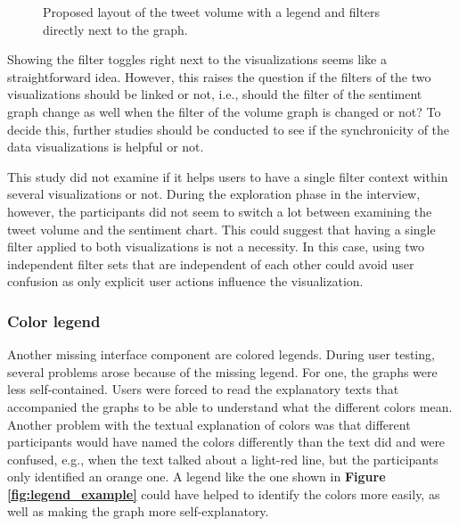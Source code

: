 \begin{figure}[h!tb]
    \caption{Proposed layout of the tweet volume with a legend and filters directly next to the graph.}
    \label{fig:legend_and_filters}
\end{figure}

Showing the filter toggles right next to the visualizations seems like a straightforward idea. However, this raises the question if the filters of the two visualizations should be linked or not, i.e., should the filter of the sentiment graph change as well when the filter of the volume graph is changed or not? To decide this, further studies should be conducted to see if the synchronicity of the data visualizations is helpful or not.

This study did not examine if it helps users to have a single filter context within several visualizations or not. During the exploration phase in the interview, however, the participants did not seem to switch a lot between examining the tweet volume and the sentiment chart. This could suggest that having a single filter applied to both visualizations is not a necessity. In this case, using two independent filter sets that are independent of each other could avoid user confusion as only explicit user actions influence the visualization.

\subsubsection*{Color legend}
Another missing interface component are colored legends. During user testing, several problems arose because of the missing legend. For one, the graphs were less self-contained. Users were forced to read the explanatory texts that accompanied the graphs to be able to understand what the different colors mean. Another problem with the textual explanation of colors was that different participants would have named the colors differently than the text did and were confused, e.g., when the text talked about a light-red line, but the participants only identified an orange one. A legend like the one shown in \textbf{Figure \ref{fig:legend_example}} could have helped to identify the colors more easily, as well as making the graph more self-explanatory.

